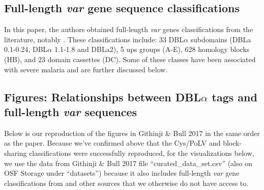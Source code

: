 \documentclass[10pt,twocolumn,superscriptaddress]{revtex4-1}
\newcommand{\var}{{\it var}\xspace}
\newcommand{\dbla}{{DBL$\alpha$}\xspace}
\newcommand{\cp}{{Cys/PoLV}\xspace}
\newcommand{\paper}{{Githinji \& Bull 2017}\xspace}
\begin{document}
\subsection{Full-length \var gene sequence classifications}
In this paper, the authors obtained full-length \var genes classifications from the literature, notably \cite{rask2010}. These classifications include: 33 \dbla subdomains (DBLa 0.1-0.24, \dbla 1.1-1.8 and DBLa2), 5 ups groups (A-E), 628 homology blocks (HB), and 23 domain cassettes (DC). Some of these classes have been associated with severe malaria and are further discussed below. 

\subsection{Figures: Relationships between \dbla tags and full-length \var sequences}
Below is our reproduction of the figures in \paper in the same order as the paper. Because we've confirmed above that the \cp and block-sharing classifications were successfully reproduced, for the visualizations below, we use the data from \paper file ``curated\_data\_set.csv'' (also on OSF Storage under ``datasets'') because it also includes full-length \var gene classifications from \cite{rask2010} and other sources that we otherwise do not have access to. 
\end{document}
